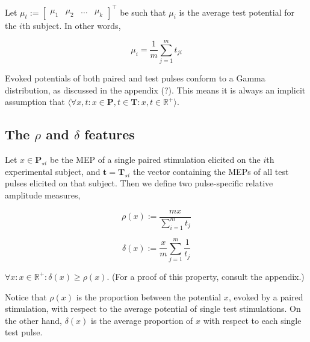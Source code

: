 \documentclass{article}
\begin{document}
\begin{multicols}{2}
\begin{definition} 
    Let $\mu_t := \begin{bmatrix} \mu_1 & \mu_2 & \ldots & \mu_k
    \end{bmatrix}^\top$ be such that $\mu_i$ is the average test potential for
    the $i$th subject. In other words,

\begin{equation} 
    \mu_i = \frac{1}{m}\sum_{j=1}^m t_{ji}
\end{equation} \end{definition}

\begin{remark} 
    Evoked potentials of both paired and test pulses conform to a Gamma
    distribution, as discussed in the appendix (?). This means it is always an
    implicit assumption that $\langle\forall x, t : x \in \textbf{P}, t\in \textbf{T}
    : x, t \in \mathbb{R}^+\rangle$. 
\end{remark}

\subsection{The $\rho$ and $\delta$ features}

\begin{definition} 
    Let $x \in \textbf{P}_{\star i}$ be the MEP of a single paired stimulation
    elicited on the $i$th experimental subject, and $\textbf{t} =
    \textbf{T}_{\star i}$ the vector containing the MEPs of all test pulses
    elicited on that subject. Then we define two pulse-specific relative
    amplitude measures,

    \begin{equation} 
        \rho(x) := \frac{mx}{\sum_{i=1}^mt_j}
    \end{equation}

    \begin{equation} 
        \delta(x) := \frac{x}{m}\sum_{j=1}^m\frac{1}{t_j} 
    \end{equation}
\end{definition}

\begin{remark} 
    $\forall x: x \in \mathbb{R}^+:\delta(x) \geq \rho(x)$. (For a proof of this
    property, consult the appendix.) 
\end{remark}

Notice that $\rho(x)$ is the proportion between the potential
$x$, evoked by a paired stimulation, with respect to the
average potential of single test stimulations. On the other
hand, $\delta(x)$ is the average proportion of $x$ with respect
to each single test pulse.



\end{multicols}
\end{document}
